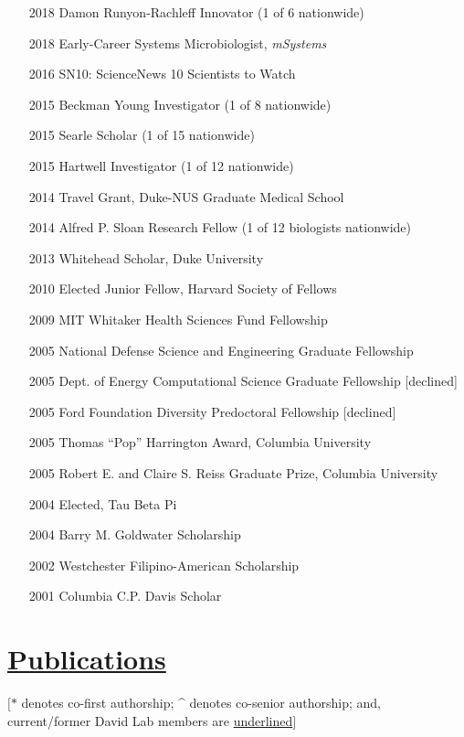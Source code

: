 \documentclass[overlapped,line,11pt]{res}
\begin{document}
\begin{resume}
\begin{itemize}[leftmargin=1cm, style=sameline, itemsep=0mm]
\item[2018] Damon Runyon-Rachleff Innovator (1 of 6 nationwide)
\item[2018] Early-Career Systems Microbiologist, \emph{mSystems}
\item[2016] SN10: ScienceNews 10 Scientists to Watch
\item[2015] Beckman Young Investigator (1 of 8 nationwide)
\item[2015] Searle Scholar (1 of 15 nationwide)
\item[2015] Hartwell Investigator (1 of 12 nationwide)
\item[2014] Travel Grant, Duke-NUS Graduate Medical School
\item[2014] Alfred P. Sloan Research Fellow (1 of 12 biologists nationwide)
\item[2013] Whitehead Scholar, Duke University%
\item[2010] Elected Junior Fellow, Harvard Society of Fellows%
\item[2009] MIT Whitaker Health Sciences Fund Fellowship %
\item[2005] National Defense Science and Engineering Graduate
  Fellowship
\item[2005] Dept. of Energy Computational Science Graduate Fellowship [declined]
\item[2005] Ford Foundation Diversity Predoctoral Fellowship [declined]
\item[2005] Thomas ``Pop'' Harrington Award, Columbia University
\item[2005] Robert E. and Claire S. Reiss Graduate Prize, Columbia University
\item[2004] Elected, Tau Beta Pi
\item[2004] Barry M. Goldwater Scholarship
\item[2002] Westchester Filipino-American Scholarship
\item[2001] Columbia C.P. Davis Scholar

\end{itemize}

\section{\underline{\sc Publications}} 
\vspace{.1in} $[\ast$ denotes co-first authorship; \^{} denotes co-senior
  authorship; and, current/former David Lab members are \underline{underlined}$]$
\vspace{.1in}


\end{resume}
\end{document}
